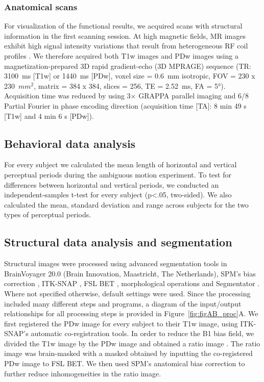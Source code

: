 \subsubsection{Anatomical scans}
For visualization of the functional results, we acquired scans with structural information in the first scanning session. At high magnetic fields, MR images exhibit high signal intensity variations that result from heterogeneous RF coil profiles \parencite{Moortele2009}. We therefore acquired both T1w images and PDw images using a magnetization-prepared 3D rapid gradient-echo (3D MPRAGE) sequence (TR: 3100~ms [T1w] or 1440~ms [PDw], voxel size = 0.6~mm isotropic, FOV = 230 x 230~$mm^2$, matrix = 384 x 384, slices = 256, TE = 2.52~ms, FA = 5°). Acquisition time was reduced by using 3× GRAPPA parallel imaging and 6/8 Partial Fourier in phase encoding direction (acquisition time [TA]: 8 min 49 s [T1w] and 4 min 6 s [PDw]).

\subsection{Behavioral data analysis}
For every subject we calculated the mean length of horizontal and vertical perceptual periods during the ambiguous motion experiment. To test for differences between horizontal and vertical periods, we conducted an independent-samples t-test for every subject (p\textless.05, two-sided). We also calculated the mean, standard deviation and range across subjects for the two types of perceptual periods.

\subsection{Structural data analysis and segmentation}
Structural images were processed using advanced segmentation tools in BrainVoyager 20.0 (Brain Innovation, Maastricht, The Netherlands), SPM's bias correction \parencite{Ashburner2005}, ITK-SNAP \parencite{py06nimg}, FSL BET \parencite{Smith2002}, morphological operations \parencite{scipy2001} and Segmentator \parencite{Gulban2018a}. Where not specified otherwise, default settings were used. Since the processing included many different steps and programs, a diagram of the input/output relationships for all processing steps is provided in Figure~\ref{fig:figAB_proc}A. We first registered the PDw image for every subject to their T1w image, using ITK-SNAP's automatic co-registration tools. In order to reduce the B1 bias field, we divided the T1w image by the PDw image and obtained a ratio image \parencite{Moortele2009}. The ratio image was brain-masked with a masked obtained by inputting the co-registered PDw image to FSL BET. We then used SPM's anatomical bias correction to further reduce inhomogeneities in the ratio image.

